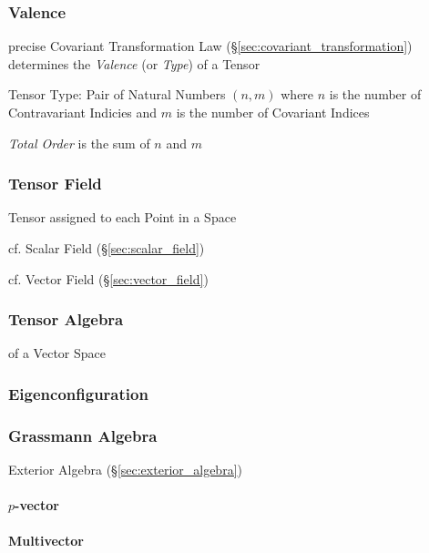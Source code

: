\subsubsection{Valence}\label{sec:valence}

precise Covariant Transformation Law
(\S\ref{sec:covariant_transformation}) determines the \emph{Valence}
(or \emph{Type}) of a Tensor

Tensor Type: Pair of Natural Numbers $(n,m)$ where $n$ is the number
of Contravariant Indicies and $m$ is the number of Covariant Indices

\emph{Total Order} is the sum of $n$ and $m$



\subsubsection{Tensor Field}\label{sec:tensor_field}

Tensor assigned to each Point in a Space

cf. Scalar Field (\S\ref{sec:scalar_field})

cf. Vector Field (\S\ref{sec:vector_field})



\subsubsection{Tensor Algebra}\label{sec:tensor_algebra}

of a Vector Space



\subsubsection{Eigenconfiguration}\label{sec:eigenconfiguration}

\subsubsection{Grassmann Algebra}\label{sec:grassmann_algebra}

Exterior Algebra (\S\ref{sec:exterior_algebra})

\paragraph{$p$-vector}\label{sec:p_vector}\hfill

\paragraph{Multivector}\label{sec:multivector}\hfill


